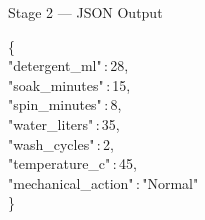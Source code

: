 \documentclass[aspectratio=169]{beamer}
\begin{document}
\begin{frame}{Stage 2 — JSON Output}
\begin{tcolorbox}[darkcode,
  title={\faCode\enspace Output JSON — Stage 2: Wash Parameters}]
\color{white}\ttfamily\small
\{\\[2pt]
\quad\textcolor{CodeYellow}{"detergent\_ml"}\,:\,\textcolor{CodePurple}{28},\\[2pt]
\quad\textcolor{CodeYellow}{"soak\_minutes"}\,:\,\textcolor{CodePurple}{15},\\[2pt]
\quad\textcolor{CodeYellow}{"spin\_minutes"}\,:\,\textcolor{CodePurple}{8},\\[2pt]
\quad\textcolor{CodeYellow}{"water\_liters"}\,:\,\textcolor{CodePurple}{35},\\[2pt]
\quad\textcolor{CodeYellow}{"wash\_cycles"}\,:\,\textcolor{CodePurple}{2},\\[2pt]
\quad\textcolor{CodeYellow}{"temperature\_c"}\,:\,\textcolor{CodePurple}{45},\\[2pt]
\quad\textcolor{CodeYellow}{"mechanical\_action"}\,:\,\textcolor{CodeGreen}{"Normal"}\\[2pt]
\}
\end{tcolorbox}
\end{frame}
\end{document}
